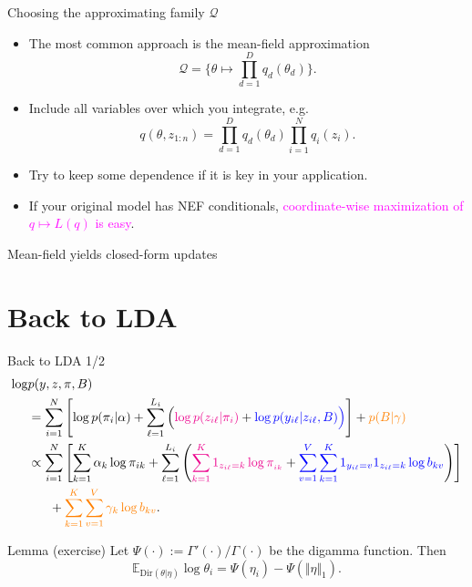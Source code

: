 \documentclass[10pt]{beamer}
\newcommand\un[1]{\textcolor{magenta}{#1}}
\newcommand\unn[1]{\textcolor{blue}{#1}}
\newcommand\unnnn[1]{\textcolor{orange}{#1}}
\begin{document}
\begin{frame}{Choosing the approximating family $\mathcal Q$}
\begin{itemize}
  \item The most common approach is the mean-field approximation
  $$ \mathcal Q = \{\theta\mapsto \prod_{d=1}^D q_d(\theta_d)\}.$$
  \item Include all variables over which you integrate, e.g.
  \vfill
  \vfill
  $$
  q(\theta, z_{1:n}) = \prod_{d=1}^D q_d(\theta_d) \prod_{i=1}^N q_i(z_i).
  $$
\end{itemize}
\begin{itemize}
  \item Try to keep some dependence if it is key in your application.
  \item If your original model has NEF conditionals, \un{coordinate-wise maximization of $q\mapsto L(q)$ is easy}.
\end{itemize}
\end{frame}

\begin{frame}{Mean-field yields closed-form updates}
\end{frame}

\section{Back to LDA}
\begin{frame}{Back to LDA 1/2}
  \footnotesize
\begin{align*}
  \log &p(y, z, \pi, B)\\
  &=\sum_{i=1}^N \left[\log p(\pi_i\vert \alpha) + \sum_{\ell=1}^{L_i} \Big(\un{\log p(z_{i\ell}\vert\pi_i)} + \unn{\log p(y_{i\ell}\vert z_{i\ell}, B)\Big)}\right] + \unnnn{p(B\vert \gamma)}\\
  &\propto \sum_{i=1}^N \left[\sum_{k=1}^K \alpha_k \log \pi_{ik} + \sum_{\ell=1}^{L_i} \left(\un{\sum_{k=1}^K 1_{z_{i\ell}=k}\log\pi_{_{ik}}} + \unn{\sum_{v=1}^V \sum_{k=1}^K 1_{y_{i\ell}=v}1_{z_{i\ell}=k} \log b_{kv}}\right)\right] \\
  &~~~~~+ \unnnn{\sum_{k=1}^K \sum_{v=1}^V \gamma_k\log b_{kv}}.
\end{align*}
\vfill
\vspace{1cm}
\begin{block}{Lemma (exercise)}
Let $\Psi(\cdot) := \Gamma'(\cdot)/\Gamma(\cdot)$ be the digamma function. Then
$$
\mathbb{E}_{\text{Dir}(\theta\vert\eta)} \log \theta_i = \Psi(\eta_i) - \Psi(\Vert \eta\Vert_1).
$$
\end{block}
\vfill
\end{frame}
\end{document}

